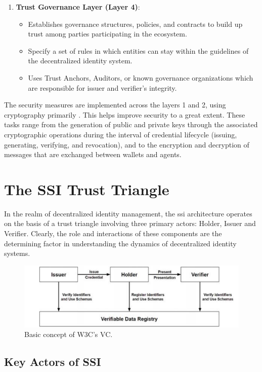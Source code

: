 \begin{enumerate}
  \item \textbf{Trust Governance Layer (Layer 4)}:
  \begin{itemize}
    \item Establishes governance structures, policies, and contracts to build up trust among parties participating in the ecosystem.
    \item Specify a set of rules in which entities can stay within the guidelines of the decentralized identity system.
    \item Uses Trust Anchors, Auditors, or known governance organizations which are responsible for issuer and verifier’s integrity.
  \end{itemize}
\end{enumerate}

The security measures are implemented across the layers 1 and 2, using cryptography primarily \cite{DIDarchitecture}. This helps improve security to a great extent. These tasks range from the 
generation of public and private keys through the associated cryptographic operations during the interval of credential lifecycle (issuing, generating, verifying, and 
revocation), and to the encryption and decryption of messages that are exchanged between wallets and agents.

\section{The SSI Trust Triangle}

In the realm of decentralized identity management, the \gls{ssi} architecture operates on the basis of a trust triangle involving three primary actors: 
Holder, Issuer and Verifier. Clearly, the role and interactions of these components are the determining factor in understanding the dynamics of decentralized identity systems.

\begin{figure}[h]  
  \centering
  \includegraphics[width=1\textwidth]{Images/c4_6.png} 
  \caption{Basic concept of W3C's VC.}
\end{figure}

\subsection{Key Actors of SSI}

